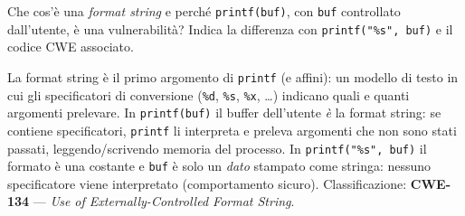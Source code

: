 \question[5]
Che cos'è una \emph{format string} e perché \lstinline|printf(buf)|, con \lstinline|buf| controllato dall'utente, è una vulnerabilità? Indica la differenza con \lstinline|printf("%s", buf)| e il codice CWE associato.
\begin{solution}
La format string è il primo argomento di \lstinline|printf| (e affini): un modello di testo in cui gli specificatori di conversione (\lstinline|%d|, \lstinline|%s|, \lstinline|%x|, \dots) indicano quali e quanti argomenti prelevare.
In \lstinline|printf(buf)| il buffer dell'utente \emph{è} la format string: se contiene specificatori, \lstinline|printf| li interpreta e preleva argomenti che non sono stati passati, leggendo/scrivendo memoria del processo. In \lstinline|printf("%s", buf)| il formato è una costante e \lstinline|buf| è solo un \emph{dato} stampato come stringa: nessuno specificatore viene interpretato (comportamento sicuro).
Classificazione: \textbf{CWE-134} --- \emph{Use of Externally-Controlled Format String}.
\end{solution}
